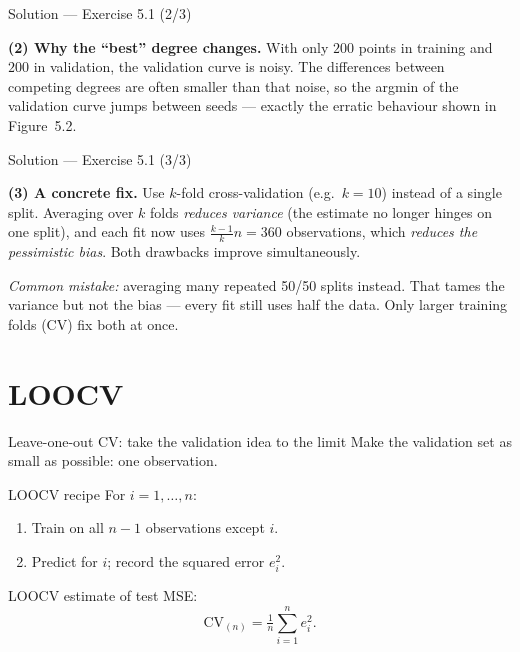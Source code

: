 \documentclass[aspectratio=169,11pt]{beamer}
\begin{document}
\begin{frame}{Solution --- Exercise 5.1 (2/3)}
  \begin{solutionbox}
    \textbf{(2) Why the ``best'' degree changes.}
    With only $200$ points in training and $200$ in validation, the
    validation curve is noisy. The differences between competing degrees
    are often smaller than that noise, so the argmin of the validation
    curve jumps between seeds --- exactly the erratic behaviour shown in
    Figure~5.2.
  \end{solutionbox}
\end{frame}

\begin{frame}{Solution --- Exercise 5.1 (3/3)}
  \begin{solutionbox}
    \textbf{(3) A concrete fix.}
    Use $k$-fold cross-validation (e.g.\ $k = 10$) instead of a single
    split. Averaging over $k$ folds \emph{reduces variance} (the
    estimate no longer hinges on one split), and each fit now uses
    $\tfrac{k-1}{k}n = 360$ observations, which \emph{reduces the
    pessimistic bias}. Both drawbacks improve simultaneously.

    \medskip
    \textit{Common mistake:} averaging many repeated 50/50 splits instead.
    That tames the variance but not the bias --- every fit still uses half
    the data. Only larger training folds (CV) fix both at once.
  \end{solutionbox}
\end{frame}


\section{LOOCV}

\begin{frame}{Leave-one-out CV: take the validation idea to the limit}
  Make the validation set as small as possible: one observation.
  \begin{block}{LOOCV recipe}
    For $i = 1, \ldots, n$:
    \begin{enumerate}
      \item Train on all $n - 1$ observations except $i$.
      \item Predict for $i$; record the squared error $e_i^2$.
    \end{enumerate}
    LOOCV estimate of test MSE:
    \[
      \boxed{\;\mathrm{CV}_{(n)} = \tfrac{1}{n}\sum_{i=1}^n e_i^2.\;}
    \]
  \end{block}
\end{frame}
\end{document}
